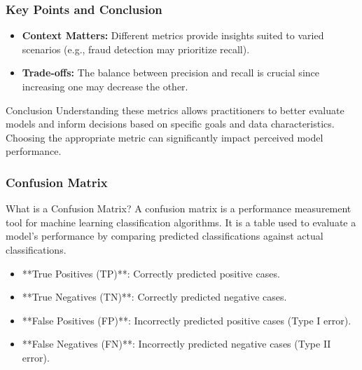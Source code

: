 \documentclass[aspectratio=169]{beamer}
\begin{document}
\begin{frame}[fragile]
    \frametitle{Key Points and Conclusion}
    \begin{itemize}
        \item \textbf{Context Matters:} Different metrics provide insights suited to varied scenarios (e.g., fraud detection may prioritize recall).
        \item \textbf{Trade-offs:} The balance between precision and recall is crucial since increasing one may decrease the other.
    \end{itemize}

    \begin{block}{Conclusion}
        Understanding these metrics allows practitioners to better evaluate models and inform decisions based on specific goals and data characteristics. Choosing the appropriate metric can significantly impact perceived model performance.
    \end{block}
\end{frame}

\begin{frame}[fragile]
    \frametitle{Confusion Matrix}
    \begin{block}{What is a Confusion Matrix?}
        A confusion matrix is a performance measurement tool for machine learning classification algorithms. It is a table used to evaluate a model's performance by comparing predicted classifications against actual classifications.
    \end{block}
    \begin{itemize}
        \item **True Positives (TP)**: Correctly predicted positive cases.
        \item **True Negatives (TN)**: Correctly predicted negative cases.
        \item **False Positives (FP)**: Incorrectly predicted positive cases (Type I error).
        \item **False Negatives (FN)**: Incorrectly predicted negative cases (Type II error).
    \end{itemize}
\end{frame}
\end{document}
